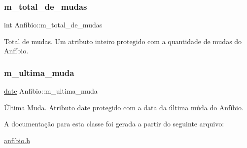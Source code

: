 \subsubsection{\texorpdfstring{m\+\_\+total\+\_\+de\+\_\+mudas}{m\_total\_de\_mudas}}
{\footnotesize\ttfamily int Anfibio\+::m\+\_\+total\+\_\+de\+\_\+mudas\hspace{0.3cm}{\ttfamily [protected]}}

Total de mudas. Um atributo inteiro protegido com a quantidade de mudas do Anfíbio. \mbox{\label{classAnfibio_a0cbc6ed64dc2cf979407b45053c838e9}} 
\subsubsection{\texorpdfstring{m\+\_\+ultima\+\_\+muda}{m\_ultima\_muda}}
{\footnotesize\ttfamily \hyperlink{classdate}{date} Anfibio\+::m\+\_\+ultima\+\_\+muda\hspace{0.3cm}{\ttfamily [protected]}}

Última Muda. Atributo date protegido com a data da última múda do Anfíbio. 

A documentação para esta classe foi gerada a partir do seguinte arquivo\+:\begin{DoxyCompactItemize}
\item 
\hyperlink{anfibio_8h}{anfibio.\+h}\end{DoxyCompactItemize}
